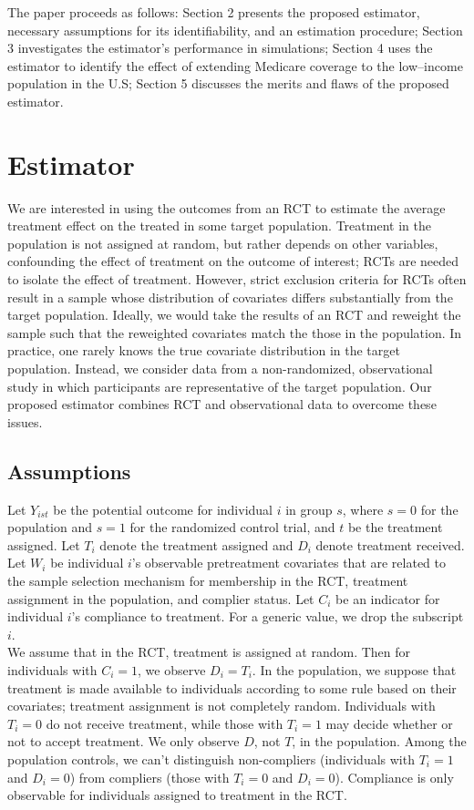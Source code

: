 \documentclass[12pt]{article}
\begin{document}
The paper proceeds as follows: Section 2 presents the proposed estimator, necessary assumptions for its identifiability, and an estimation procedure; Section 3 investigates the estimator's performance in simulations; Section 4 uses the estimator to identify the effect of extending Medicare coverage to the low--income population in the U.S; Section 5 discusses the merits and flaws of the proposed estimator.

\section{Estimator} \label{estimator}
We are interested in using the outcomes from an RCT to estimate the average treatment effect on the treated in some target population.  Treatment in the population is not assigned at random, but rather depends on other variables, confounding the effect of treatment on the outcome of interest; RCTs are needed to isolate the effect of treatment. However, strict exclusion criteria for RCTs often result in a sample whose distribution of covariates differs substantially from the target population.  Ideally, we would take the results of an RCT and reweight the sample such that the reweighted covariates match the those in the population. In practice, one rarely knows the true covariate distribution in the target population.  Instead, we consider data from a non-randomized, observational study in which participants are representative of the target population.  Our proposed estimator combines RCT and observational data to overcome these issues.

\subsection{Assumptions} 
Let $Y_{ist}$ be the potential outcome for individual $i$ in group $s$, where $s=0$ for the population and $s=1$ for the randomized control trial, and $t$ be the treatment assigned.  Let $T_i$ denote the treatment assigned and $D_i$ denote treatment received. Let $W_i$ be individual $i$'s observable pretreatment covariates that are related to the sample selection mechanism for membership in the RCT, treatment assignment in the population, and complier status.  Let $C_i$ be an indicator for individual $i$'s compliance to treatment.  For a generic value, we drop the subscript $i$.  \\

We assume that in the RCT, treatment is assigned at random.  Then for individuals with $C_i = 1$, we observe $D_i = T_i$.  In the population, we suppose that treatment is made available to individuals according to some rule based on their covariates; treatment assignment is not completely random. Individuals with $T_i = 0$ do not receive treatment, while those with $T_i=1$ may decide whether or not to accept treatment.  We only observe $D$, not $T$, in the population.  Among the population controls, we can't distinguish non-compliers (individuals with $T_i=1$ and $D_i = 0$) from compliers (those with $T_i = 0$ and $D_i = 0$).  Compliance is only observable for individuals assigned to treatment in the RCT. \\
\end{document}

